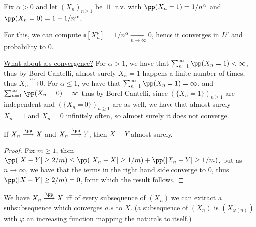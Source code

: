 \documentclass[../main.tex]{subfiles}
\begin{document}
   \begin{example}
     Fix $\alpha > 0$ and let $(X_n)_{n \geq 1}$ be $\perp\!\!\!\!\,\perp$ r.v. with
     $\pp(X_n=1) = 1/n^\alpha$ and $\pp(X_n = 0) = 1 - 1/n^\alpha$.

     \vspace{1em}

     \noindent
     For this, we can compute $\ee[X_n^p] = 1/n^\alpha \underset{n \to
     \infty}{\longrightarrow} 0$, hence it converges in $L^p$ and probability
     to $0$.
     
     \vspace{0.5em}
     \noindent\underline{What about a.s convergence?}
     \newline
     For $\alpha > 1$, we have that $\sum_{n=1}^\infty \pp(X_n = 1) < \infty$,
     thus by Borel Cantelli, almost surely $X_n = 1$ happens a finite number
     of times, thus $X_n \overset{a.s.}{\longrightarrow}0$.
     \newline
     For $\alpha \leq 1$, we have that $\sum_{n=1}^\infty \pp(X_n = 1) =
     \infty$, and $\sum_{n = 1}^\infty \pp(X_n = 0) = \infty$
     thus by Borel Cantelli, since $(\{ X_n = 1 \})_{n \geq 1}$ are
     independent and $(\{ X_n = 0 \})_{n \geq 1}$ are as well, we have 
     that almost surely $X_n = 1$ and $X_n = 0$ infinitely often, so almost
     surely it does not converge.
   \end{example}
  \begin{lemma}
      If $X_n \overset{\pp}{\longrightarrow} X$ and $X_n \overset{\pp}{\longrightarrow} Y$, then $X = Y$  almost surely.
  \end{lemma}
  \begin{proof}
    Fix $m \geq 1$, then $\pp(|X - Y| \geq 2/m) \leq \pp(|X_n - X| \geq 1/m) +  
    \pp(|X_n - Y| \geq 1/m)$, but as $n \to \infty$, we have that the terms in
    the right hand side converge to $0$, thus $\pp(|X - Y| \geq 2/m) = 0$,
    fomr which the result follows.
  \end{proof}
   \begin{lemma}
     We have $X_n \overset{\pp}{\longrightarrow} X$ iff of every subsequence
     of $(X_n)$ we can extract a subsubsequence which converges $a.s$ to $X$.
     (a subsequence of $(X_n)$ is $(X_{\varphi(n)})$ with $\varphi$ an increasing
     function mapping the naturals to itself.)
   \end{lemma}
\end{document}

